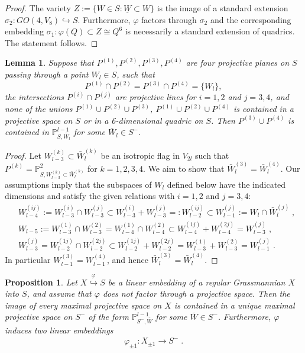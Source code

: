 \documentclass[12pt]{amsart}
\def\PP {{\mathbb P}}     %
\def\hw  {\hookrightarrow}
\def\ul  {\underline}
\newtheorem{lemma}[theorem]{Lemma}
\newtheorem{prop}[theorem]{Proposition}
\begin{document}
\begin{proof}
The variety $Z:=\{W\in S:\ul{W}\subset W\}$ is the image of a standard extension $\sigma_2:GO(4,V_8)\hw S$. Furthermore, $\varphi$ factors through $\sigma_2$ and the corresponding embedding $\sigma_1:\varphi(Q)\subset Z\cong Q^6$ is necessarily a standard extension of quadrics. The statement follows.
\end{proof}


\begin{lemma}\label{Lemma 4 planes in S}
Suppose that $P^{(1)},P^{(2)},P^{(3)},P^{(4)}$ are four projective planes on $S$ passing through a point $W_l\in S$, such that
$$
P^{(1)}\cap P^{(2)} = P^{(3)}\cap P^{(4)} = \{W_l\},
$$
the intersections $P^{(i)}\cap P^{(j)}$ are projective lines for $i=1,2$ and $j=3,4$, and none of the unions $P^{(1)}\cup P^{(2)}\cup P^{(3)}$, $P^{(1)}\cup P^{(2)}\cup P^{(4)}$ is contained in a projective space on $S$ or in a 6-dimensional quadric on $S$. Then $P^{(3)}\cup P^{(4)}$ is contained in $\PP^{l-1}_{S,\bar W_l}$ for some $\bar W_l\in S^-$.
\end{lemma}

\begin{proof}
Let $W^{(k)}_{l-3}\subset \bar W^{(k)}_{l}$ be an isotropic flag in $V_{2l}$ such that $P^{(k)}=\PP^{2}_{S,W^{(k)}_{l-3}\subset \bar W^{(k)}_{l}}$ for $k=1,2,3,4$. We aim to show that $\bar W^{(3)}_{l}= \bar W^{(4)}_{l}$. Our assumptions imply that the subspaces of $W_l$ defined below have the indicated dimensions and satisfy the given relations with $i=1,2$ and $j=3,4$:
\begin{align*}
& W^{(ij)}_{l-4} := W^{(i)}_{l-3}\cap W^{(j)}_{l-3} \subset W^{(i)}_{l-3} + W^{(j)}_{l-3} =: W^{(ij)}_{l-2} \subset W^{(j)}_{l-1}:= W_{l}\cap \bar W^{(j)}_{l} \;,\\
& W_{l-5}:=W^{(1)}_{l-3}\cap W^{(2)}_{l-3} =W^{(1)}_{l-4}\cap W^{(2)}_{l-4} \subset W^{(1j)}_{l-4}+ W^{(2j)}_{l-4}=W^{(j)}_{l-3} \;,\\
& W^{(j)}_{l-3}=W^{(1j)}_{l-2}\cap W^{(2j)}_{l-2} \subset W^{(1j)}_{l-2}+ W^{(2j)}_{l-2}= W^{(1)}_{l-3} + W^{(2)}_{l-3} =W^{(j)}_{l-1}\;.
\end{align*}
In particular $W^{(3)}_{l-1}=W^{(4)}_{l-1}$, and hence $\bar W^{(3)}_{l}=\bar W^{(4)}_{l}$.
\end{proof}

\begin{prop}\label{Prop phi plusminus 1 embedding}
Let $X\stackrel{\varphi}{\hw} S$ be a linear embedding of a regular Grassmannian $X$ into $S$, and assume that $\varphi$ does not factor through a projective space. Then the image of every maximal projective space on $X$ is contained in a unique maximal projective space on $S^{-}$ of the form $\PP^{l-1}_{S^{-},\bar W}$ for some $\bar W\in S^{-}$. Furthermore, $\varphi$ induces two linear embeddings
\begin{gather}\label{For phi plus minus}
\varphi_{\pm1}:X_{\pm 1} \to S^{-} \;.
\end{gather}
\end{prop}
\end{document}
